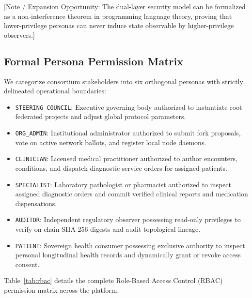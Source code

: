 [Note / Expansion Opportunity: The dual-layer security model can be formalized as a non-interference theorem in programming language theory, proving that lower-privilege personas can never induce state observable by higher-privilege observers.]

\subsection{Formal Persona Permission Matrix}
We categorize consortium stakeholders into six orthogonal personas with strictly delineated operational boundaries:
\begin{itemize}
    \item \texttt{STEERING\_COUNCIL}: Executive governing body authorized to instantiate root federated projects and adjust global protocol parameters.
    \item \texttt{ORG\_ADMIN}: Institutional administrator authorized to submit fork proposals, vote on active network ballots, and register local node daemons.
    \item \texttt{CLINICIAN}: Licensed medical practitioner authorized to author encounters, conditions, and dispatch diagnostic service orders for assigned patients.
    \item \texttt{SPECIALIST}: Laboratory pathologist or pharmacist authorized to inspect assigned diagnostic orders and commit verified clinical reports and medication dispensations.
    \item \texttt{AUDITOR}: Independent regulatory observer possessing read-only privileges to verify on-chain SHA-256 digests and audit topological lineage.
    \item \texttt{PATIENT}: Sovereign health consumer possessing exclusive authority to inspect personal longitudinal health records and dynamically grant or revoke access consent.
\end{itemize}

Table~\ref{tab:rbac} details the complete Role-Based Access Control (RBAC) permission matrix across the platform.

